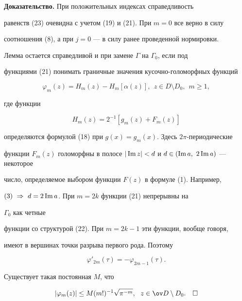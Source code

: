 {\bf Доказательство.} При положительных индексах справедливость 


равенств (23) очевидна с учетом (19) и (21). При $m=0$ все верно в силу


соотношения (8), а при $j=0$ --- в силу ранее проведенной нормировки. 


 


Лемма остается справедливой и при замене $\Gamma$ на $\Gamma_0$, если под 


функциями (21) понимать граничные значения кусочно-голоморфных функций 


$$ 


\varphi_m(z)=H_m(z)-H_m[\alpha(z)],\ \ z\in D\setminus D_0, 


\ \ m\ge1, 


$$ 


где функции 


\begin{equation} 


H_m(z)=2^{-1}[g_m(z)+F_m(z)] 


\end{equation} 


определяются формулой (18) при $g(x)=g_m(x)$. Здесь $2\pi$-периодические 


функции $F_m(z)$ голоморфны в полосе $|\im z|<d$ и $d\in(\im a,\ 2\im 


a)$ --- некоторое 


число, определяемое выбором функции $F(z)$ в формуле (1). Например,  


$(3)\ \Rightarrow\ d=2\operatorname{Im} a$. При $m=2k$ функции (21) непрерывны на 


$\Gamma_0$ как четные 


функции со структурой (22). При $m=2k-1$ эти функции, вообще говоря,  


имеют в вершинах точки разрыва первого рода. Поэтому 


\begin{equation} 


\varphi'_{2m}(\tau)=-\varphi_{2m-1}(\tau). 


\end{equation} 


Существует такая постоянная $M$, что 


\begin{equation} 


|\varphi_m(z)|\le M(m!)^{-1}\sqrt{\pi^{-m}},\ \ 


z\in\ov D\setminus D_0.\quad\square 


\end{equation} 


